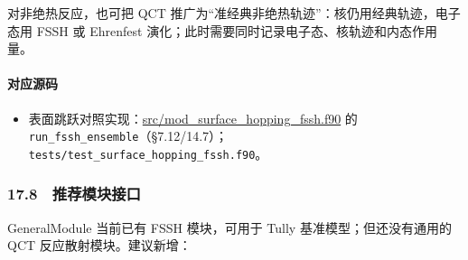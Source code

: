 \documentclass[
]{ctexbook}
\providecommand{\tightlist}{%
  \setlength{\itemsep}{0pt}\setlength{\parskip}{0pt}}
\begin{document}
对非绝热反应，也可把 QCT
推广为``准经典非绝热轨迹''：核仍用经典轨迹，电子态用 FSSH 或 Ehrenfest
演化；此时需要同时记录电子态、核轨迹和内态作用量。

\hypertarget{ux5bf9ux5e94ux6e90ux7801-79}{%
\paragraph{对应源码}\label{ux5bf9ux5e94ux6e90ux7801-79}}

\begin{itemize}
\tightlist
\item
  表面跳跃对照实现：\href{https://github.com/l1Ha/QuantumGeneralModule/blob/main/src/mod_surface_hopping_fssh.f90}{src/mod\_surface\_hopping\_fssh.f90}
  的
  \texttt{run\_fssh\_ensemble}（§7.12/14.7）；\texttt{tests/test\_surface\_hopping\_fssh.f90}。
\end{itemize}

\hypertarget{ux63a8ux8350ux6a21ux5757ux63a5ux53e3}{%
\subsubsection{17.8　推荐模块接口}\label{ux63a8ux8350ux6a21ux5757ux63a5ux53e3}}

GeneralModule 当前已有 FSSH 模块，可用于 Tully 基准模型；但还没有通用的
QCT 反应散射模块。建议新增：
\end{document}

